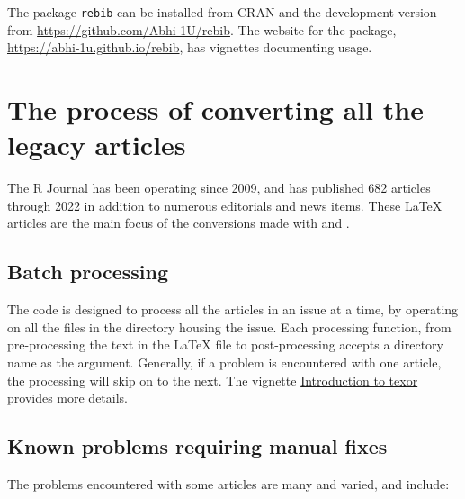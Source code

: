 The package \texttt{rebib} can be installed from CRAN and the development version from \url{https://github.com/Abhi-1U/rebib}. The website for the package, \url{https://abhi-1u.github.io/rebib}, has vignettes documenting usage.

\hypertarget{the-process-of-converting-all-the-legacy-articles}{%
\section{The process of converting all the legacy articles}\label{the-process-of-converting-all-the-legacy-articles}}

The R Journal has been operating since 2009, and has published 682 articles through 2022 in addition to numerous editorials and news items. These LaTeX articles are the main focus of the conversions made with  and .

\hypertarget{batch-processing}{%
\subsection{Batch processing}\label{batch-processing}}

The code is designed to process all the articles in an issue at a time, by operating on all the files in the directory housing the issue. Each processing function, from pre-processing the text in the LaTeX file to post-processing accepts a directory name as the argument. Generally, if a problem is encountered with one article, the processing will skip on to the next. The vignette \href{https://abhi-1u.github.io/texor/articles/introduction-to-texor.html}{Introduction to texor} provides more details.

\hypertarget{known-problems-requiring-manual-fixes}{%
\subsection{Known problems requiring manual fixes}\label{known-problems-requiring-manual-fixes}}

The problems encountered with some articles are many and varied, and include:

